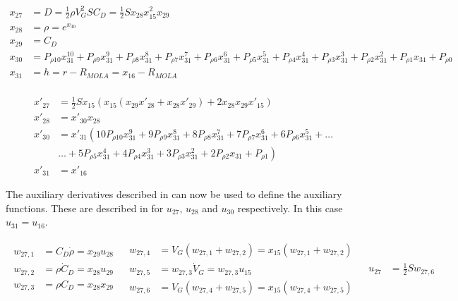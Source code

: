  \begin{equation} \label{eq:dragAux}
\begin{split}
x_{27} &= D = \frac{1}{2}\rho V_{G}^{2}SC_{D} = \frac{1}{2}Sx_{28}x_{15}^{2}x_{29}\\
x_{28} &= \rho = e^{x_{30}} \\
x_{29} &= C_{D} \\
x_{30} &= P_{\rho 10}x_{31}^{10}+P_{\rho 9}x_{31}^{9}+P_{\rho 8}x_{31}^{8}+P_{\rho 7}x_{31}^{7}+P_{\rho 6}x_{31}^{6}+P_{\rho 5}x_{31}^{5}+P_{\rho 4}x_{31}^{4}+P_{\rho 3}x_{31}^{3}+P_{\rho 2}x_{31}^{2}+P_{\rho 1}x_{31}+P_{\rho 0} \\
x_{31} &= h = r-R_{MOLA} = x_{16}-R_{MOLA} \\
\end{split}
\end{equation}

 \begin{equation} \label{eq:dragDerAux}
\begin{split}
x'_{27} &= \frac{1}{2}Sx_{15}\left(x_{15} \left(x_{29}x'_{28}+x_{28}x'_{29}\right)+2x_{28}x_{29}x'_{15}\right) \\
x'_{28} &= x'_{30}x_{28} \\
x'_{30} &=x'_{31} \left(10 P_{\rho 10}x_{31}^{9}+9 P_{\rho 9}x_{31}^{8}+8 P_{\rho 8}x_{31}^{7}+7 P_{\rho 7}x_{31}^{6}+6 P_{\rho 6}x_{31}^{5}+\dots \right. \\
&  \left. \dotsc +5 P_{\rho 5}x_{31}^{4}+4 P_{\rho 4}x_{31}^{3}+3 P_{\rho 3}x_{31}^{2}+2 P_{\rho 2}x_{31}+P_{\rho 1}\right) \\
x'_{31} &= x'_{16}
\end{split}
\end{equation}

The auxiliary derivatives described in  can now be used to define the auxiliary functions. These are described in  for $u_{27}$, $u_{28}$ and $u_{30}$ respectively. In this case $u_{31}=u_{16}$.

\begin{align} \label{eq:u27}
\begin{split}
w_{27,1} &= C_{D}\dot{\rho} = x_{29}u_{28} \\
w_{27,2} &= \rho \dot{C}_{D} = x_{28}u_{29} \\
w_{27,3} &= \rho C_{D} = x_{28}x_{29} \\
\end{split}
&
\begin{split}
w_{27,4} &= V_{G}\left(w_{27,1}+w_{27,2}\right) = x_{15}\left(w_{27,1}+w_{27,2}\right) \\
w_{27,5} &= w_{27,3}\dot{V}_{G} = w_{27,3}u_{15} \\
w_{27,6} &= V_{G}\left(w_{27,4}+w_{27,5}\right) = x_{15}\left(w_{27,4}+w_{27,5}\right) \\
\end{split}
&
\begin{split}
u_{27} &= \frac{1}{2} S w_{27,6}\\
\end{split}
\end{align}

